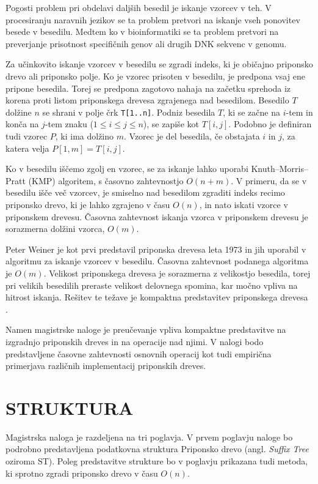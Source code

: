 Pogosti problem pri obdelavi daljših besedil je iskanje vzorcev v teh. V procesiranju naravnih jezikov se ta problem pretvori na iskanje vseh ponovitev besede v besedilu. Medtem ko v bioinformatiki se ta problem pretvori na preverjanje prisotnost specifičnih genov ali drugih DNK sekvenc v genomu. 

Za učinkovito iskanje vzorcev v besedilu se zgradi indeks, ki je običajno priponsko drevo ali priponsko polje. Ko je vzorec prisoten v besedilu, je predpona vsaj ene pripone besedila. Torej se predpona zagotovo nahaja na začetku sprehoda iz korena proti listom priponskega drevesa zgrajenega nad besedilom.
Besedilo $T$ dolžine $n$ se shrani v polje črk \texttt{T[1..n]}. Podniz besedila $T$, ki se začne na $i$-tem in konča na $j$-tem znaku ($1\leq i \leq j \leq n$), se zapiše kot $T[i,j]$.  Podobno je definiran tudi vzorec $P$, ki ima dolžino $m$.  Vzorec je del besedila, če obstajata $i$ in $j$, za katera velja $P[1,m]=T[i,j]$.

Ko v besedilu iščemo zgolj en vzorec, se za iskanje lahko uporabi Knuth–Morris–Pratt (KMP) algoritem, s časovno zahtevnostjo $O(n+m)$.  V primeru, da se v besedilu išče več vzorcev, je smiselno nad besedilom zgraditi indeks recimo priponsko drevo, ki je lahko zgrajeno v času $O(n)$, in nato iskati vzorce v priponskem drevesu. Časovna zahtevnost iskanja vzorca v priponskem drevesu je sorazmerna dolžini vzorca, $O(m)$.

Peter Weiner je kot prvi predstavil priponska drevesa leta 1973 \cite{Weiner1973} in jih uporabil v algoritmu za iskanje vzorcev v besedilu. Časovna zahtevnost podanega algoritma je $O(m)$. Velikost priponskega drevesa je sorazmerna z velikostjo besedila, torej pri velikih besedilih preraste velikost delovnega spomina, kar močno vpliva na hitrost iskanja. Rešitev te težave je kompaktna predstavitev priponskega drevesa \cite{Navarro2016}.


Namen magistrske naloge je preučevanje vpliva kompaktne predstavitve na izgradnjo priponskih dreves in na operacije nad njimi. V nalogi bodo predstavljene  časovne zahtevnosti osnovnih operacij kot tudi empirična primerjava različnih implementacij priponskih dreves.

\section{STRUKTURA}\label{sec:struktura}

Magistrska naloga je razdeljena na tri poglavja. V prvem poglavju naloge bo podrobno predstavljena podatkovna struktura Priponsko drevo (angl. \textit{Suffix Tree} oziroma ST). Poleg predstavitve strukture bo v poglavju prikazana tudi metoda, ki sprotno zgradi priponsko drevo v času $O(n)$.

